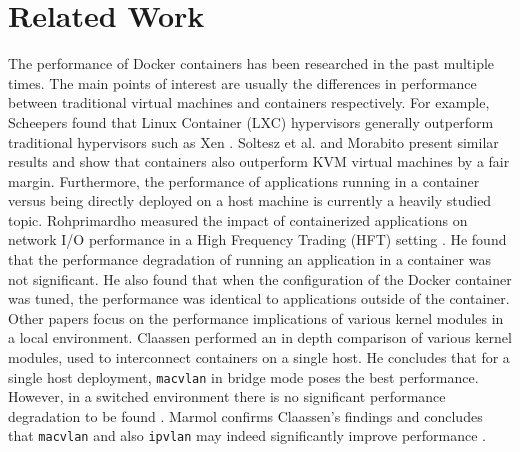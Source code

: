 \section{Related Work} \label{related}
The performance of Docker containers has been researched in the past multiple times. The main points of interest are usually the differences in performance between traditional virtual machines and containers respectively. For example, Scheepers found that Linux Container (LXC) hypervisors generally outperform traditional hypervisors such as Xen \cite{scheepers2014virtualization}. Soltesz et al. \cite{soltesz2007container} and Morabito \cite{morabitohypervisors} present similar results and show that containers also outperform KVM virtual machines by a fair margin. Furthermore, the performance of applications running in a container versus being directly deployed on a host machine is currently a heavily studied topic. Rohprimardho measured the impact of containerized applications on network I/O performance in a High Frequency Trading (HFT) setting \cite{rohprimardho2015}. He found that the performance degradation of running an application in a container was not significant. He also found that when the configuration of the Docker container was tuned, the performance was identical to applications outside of the container. Other papers focus on the performance implications of various kernel modules in a local environment. Claassen performed an in depth comparison of various kernel modules, used to interconnect containers on a single host. He concludes that for a single host deployment, \texttt{macvlan} in bridge mode poses the best performance. However, in a switched environment there is no significant performance degradation to be found \cite{jorisclaassen2015}. Marmol confirms Claassen's findings and concludes that \texttt{macvlan} and also \texttt{ipvlan} may indeed significantly improve performance \cite{marmolnetworking}. 


